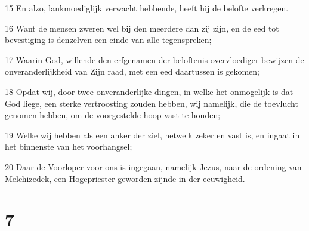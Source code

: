 \par 15 En alzo, lankmoediglijk verwacht hebbende, heeft hij de belofte verkregen.
\par 16 Want de mensen zweren wel bij den meerdere dan zij zijn, en de eed tot bevestiging is denzelven een einde van alle tegenspreken;
\par 17 Waarin God, willende den erfgenamen der beloftenis overvloediger bewijzen de onveranderlijkheid van Zijn raad, met een eed daartussen is gekomen;
\par 18 Opdat wij, door twee onveranderlijke dingen, in welke het onmogelijk is dat God liege, een sterke vertroosting zouden hebben, wij namelijk, die de toevlucht genomen hebben, om de voorgestelde hoop vast te houden;
\par 19 Welke wij hebben als een anker der ziel, hetwelk zeker en vast is, en ingaat in het binnenste van het voorhangsel;
\par 20 Daar de Voorloper voor ons is ingegaan, namelijk Jezus, naar de ordening van Melchizedek, een Hogepriester geworden zijnde in der eeuwigheid.

\chapter{7}

